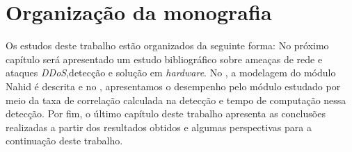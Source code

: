\section{Organização da monografia}
Os estudos deste trabalho estão organizados da seguinte forma: No próximo capítulo será apresentado um estudo bibliográfico sobre ameaças de rede e ataques \textit{DDoS},detecção e solução em \textit{hardware}. No , a modelagem do módulo Nahid é descrita e no , apresentamos o desempenho  pelo módulo estudado por meio da taxa de correlação calculada na detecção e tempo de computação nessa detecção. Por fim, o último capítulo deste trabalho apresenta as conclusões realizadas a partir dos resultados obtidos e algumas perspectivas para a continuação deste trabalho. 
